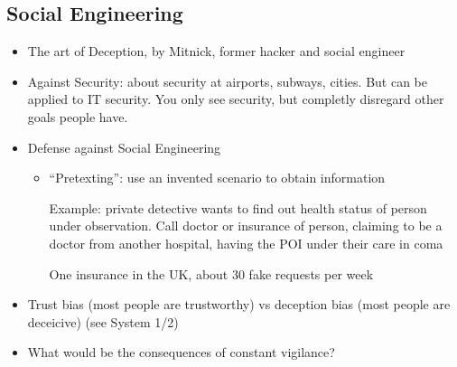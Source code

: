 \documentclass[a4paper,12pt]{scrartcl}
\begin{document}
\subsection{Social Engineering}
\begin{itemize}
	\item
		The art of Deception, by Mitnick, former hacker and social engineer
	\item
		Against Security: about security at airports, subways, cities. But can be applied to IT security. You only see security, but completly disregard other goals people have.
	\item
		Defense against Social Engineering
		\begin{itemize}
			\item
				\enquote{Pretexting}: use an invented scenario to obtain information

				Example: private detective wants to find out health status of person under observation. Call doctor or insurance of person, claiming to be a doctor from another hospital, having the POI under their care in coma

				One insurance in the UK, about 30 fake requests per week
		\end{itemize}
	\item
		Trust bias (most people are trustworthy) vs deception bias (most people are deceicive) (see System 1/2)
	\item
		What would be the consequences of constant vigilance?
\end{itemize}
\end{document}
